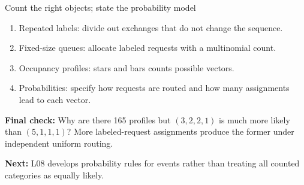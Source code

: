 \documentclass[aspectratio=169,10pt,english]{beamer}
\begin{document}
\begin{frame}{Count the right objects; state the probability model}
\small
\begin{enumerate}
\item Repeated labels: divide out exchanges that do not change the sequence.
\item Fixed-size queues: allocate labeled requests with a multinomial count.
\item Occupancy profiles: stars and bars counts possible vectors.
\item Probabilities: specify how requests are routed and how many assignments lead to each vector.
\end{enumerate}
\par\medskip
\textbf{Final check:} Why are there 165 profiles but $(3,2,2,1)$ is much more likely than $(5,1,1,1)$? More labeled-request assignments produce the former under independent uniform routing.
\par\smallskip
\textbf{Next:} L08 develops probability rules for events rather than treating all counted categories as equally likely.
\end{frame}
\end{document}
